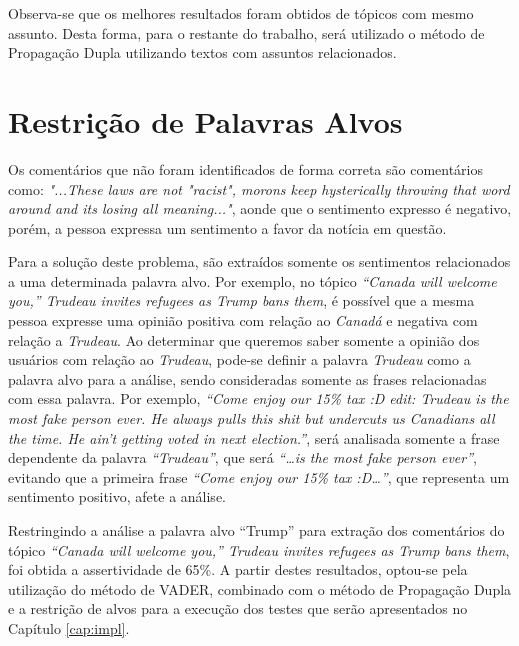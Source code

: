 Observa-se que os melhores resultados foram obtidos de tópicos com mesmo
assunto. Desta forma, para o restante do trabalho, será utilizado o método de
Propagação Dupla utilizando textos com assuntos relacionados.

\section{Restrição de Palavras Alvos}

Os comentários que não foram
identificados de forma correta são comentários como: \textit{"...These
laws are not "racist", morons keep hysterically throwing that word around and
its losing all meaning..."}, aonde que o sentimento expresso é negativo, porém,
a pessoa expressa um sentimento a favor da notícia em questão. 

Para a solução deste problema, são extraídos somente os sentimentos relacionados
a uma determinada palavra alvo. Por exemplo, no tópico \textit{``Canada will
welcome you,'' Trudeau invites refugees as Trump bans them}, é possível que a mesma pessoa expresse uma opinião positiva com relação
ao \textit{Canadá} e negativa com relação a \textit{Trudeau}. Ao determinar que
queremos saber somente a opinião dos usuários com relação ao \textit{Trudeau},
pode-se definir a palavra \textit{Trudeau} como a palavra alvo para a análise,
sendo consideradas somente as frases relacionadas com essa palavra. Por exemplo, \textit{``Come enjoy our 15\%
tax :D edit: Trudeau is the most fake person ever. He always pulls this shit but
undercuts us Canadians all the time. He ain't getting voted in next
election.''}, será analisada somente a frase dependente da palavra
\textit{``Trudeau''}, que será \textit{``\ldots is the most fake person ever''},
evitando que a primeira frase \textit{``Come enjoy our 15\% tax :D\ldots''}, que
representa um sentimento positivo, afete a análise.

Restringindo a análise a palavra alvo ``Trump'' para extração dos comentários do
tópico \textit{``Canada will welcome you,'' Trudeau invites refugees as Trump
bans them}, foi obtida a assertividade de 65\%. A partir destes resultados,
optou-se pela utilização do método de \ac{VADER}, combinado com o método de Propagação Dupla e a
restrição de alvos para a execução dos testes que serão apresentados no Capítulo
\ref{cap:impl}.



